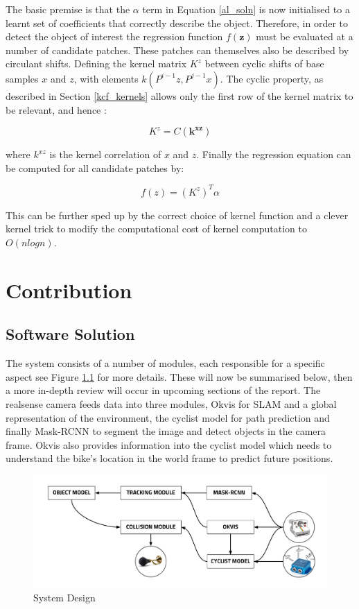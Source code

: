 \documentclass[11pt,twoside]{report}
\begin{document}
The basic premise is that the $\alpha$ term in Equation \ref{al_soln} is now initialised to a learnt set of coefficients that correctly describe the object. Therefore, in order to detect the object of interest the regression function $f(\mathbf{z})$ must be evaluated at a number of candidate patches.  These patches can themselves also be described by circulant shifts. Defining the kernel matrix $K^{z}$ between cyclic shifts of base samples $x$ and $z$, with elements $k(P^{i-1}z,P^{j-1}x)$. The cyclic property, as described in Section \ref{kcf_kernels} allows only the first row of the kernel matrix to be relevant, and hence :

\begin{equation}
K^{z} = C(\mathbf{k^{xz}})
\end{equation}

where $k^{xz}$ is the kernel correlation of $x$ and $z$. Finally the regression equation can be computed for all candidate patches by:

\begin{equation}
f(z) = (K^{z})^{T} \alpha
\end{equation}

This can be further sped up by the correct choice of kernel function and a clever kernel trick to modify the computational cost of kernel computation to $O(nlogn)$. 

\chapter{Contribution}


\section{Software Solution}
The system consists of a number of modules, each responsible for a specific aspect see Figure \ref{software_soln} for more details. These will now be summarised below, then a more in-depth review will occur in upcoming sections of the report. The realsense camera feeds data into three modules, Okvis for SLAM and a global representation of the environment, the cyclist model for path prediction and finally Mask-RCNN to segment the image and detect objects in the camera frame. Okvis also provides information into the cyclist model which needs to understand the bike's location in the world frame to predict future positions.

\noindent \begin{figure}[h!]
	\includegraphics[width = 1.0\hsize]{figures/software_architecture.png}
	\caption{System Design}
	\label{software_soln}
\end{figure}
\end{document}
